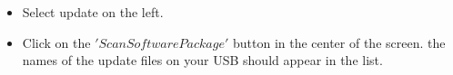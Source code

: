 \documentclass{article}
\begin{document}
\begin{itemize}
\begin{center}
\end{center}
\item Select update on the left. 
\begin{center}
\end{center}
\item Click on the $'Scan Software Package'$ button in the center of the screen. the names of the update files on your USB should appear in the list.
\begin{center}
\end{center}

\end{itemize}
\end{document}
